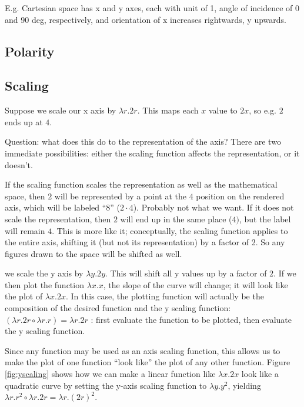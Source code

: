 \documentclass{tufte-handout}
\numberwithin{equation}{subsection}
\begin{document}
E.g. Cartesian space has x and y axes, each with unit of 1, angle of
incidence of 0 and 90 deg, respectively, and orientation of x
increases rightwards, y upwards.

\subsection{Polarity}
\label{subs:polarity}

\subsection{Scaling}
\label{subs:scaling}

Suppose we scale our x axis by \(\lambda r.2r\).  This maps each \(x\)
value to \(2x\), so e.g. \(2\) ends up at \(4\).

Question: what does this do to the representation of the axis?  There
are two immediate possibilities: either the scaling function affects
the representation, or it doesn't.

If the scaling function scales the representation as well as the
mathematical space, then \(2\) will be represented by a point at the \(4\)
position on the rendered axis, which will be labeled ``8'' (\(2\cdot
4\)).  Probably not what we want.  If it does not scale the
representation, then \(2\) will end up in the same place (\(4)\), but
the label will remain \(4\).  This is more like it; conceptually, the
scaling function applies to the entire axis, shifting it (but not its
representation) by a factor of 2.  So any figures drawn to the space
will be shifted as well.

 we scale the y axis by \(\lambda y.2y\).
This will shift all y values up by a factor of \(2\).  If we then plot
the function \(\lambda x.x\), the slope of the curve will change; it
will look like the plot of \(\lambda x.2x\).  In this case, the
plotting function will actually be the composition of the desired
function and the y scaling function: \((\lambda r.2r\circ\lambda r.r)
= \lambda r.2r\)%
: first evaluate the function to be plotted, then
evaluate the y scaling function.

Since any function may be used as an axis scaling function, this
allows us to make the plot of one function ``look like'' the plot of
any other function.  Figure \ref{fig:yscaling} shows how we can make a
linear function like \(\lambda x.2x\) look like a quadratic curve by setting the y-axis
scaling function to \(\lambda y.y^2\), yielding \(\lambda
r.r^2\circ\lambda r.2r = \lambda r.(2r)^2\).
\end{document}
